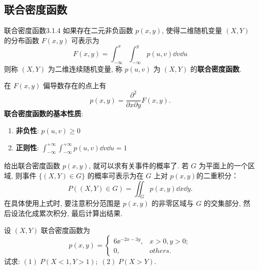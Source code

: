    \subsection{联合密度函数}\label{ssec:3.1.4}
   \begin{definition}{联合密度函数}{3.1.4}
   	如果存在二元非负函数 $p(x,y)$, 使得二维随机变量 $(X,Y)$ 的分布函数 $F(x,y)$ 可表示为
   	\begin{equation}\label{eq:3.1.3}
   	 	F(x, y)=\int_{-\infty}^{x} \int_{-\infty}^{y} p(u, v) \dd v \dd u
   	\end{equation}
   	则称 $(X,Y)$ 为二维连续随机变量, 称 $p(u,v)$ 为 $(X,Y)$ 的\textbf{联合密度函数}.
   \end{definition}
   在 $F(x,y)$ 偏导数存在的点上有
   \[
    	p(x, y)=\frac{\partial^{2}}{\partial x \partial y} F(x, y).
   \]
   \textbf{联合密度函数的基本性质}:
   \begin{enumerate}
   	\item \textbf{非负性}: $p(u,v)\geq 0$ 
   	\item \textbf{正则性}: $\int_{-\infty}^{+\infty} \int_{-\infty}^{+\infty} p(u, v) \dd v \dd u=1$
   \end{enumerate}
   给出联合密度函数 $p(x,y)$, 就可以求有关事件的概率了. 若 $G$ 为平面上的一个区域, 
   则事件 $\{(X,Y) \in G\}$ 的概率可表示为在 $G$ 上对 $p(x,y)$的二重积分：
   \begin{equation}\label{eq:3.1.4}
    	P((X, Y) \in G)=\iint_{G} p(x, y) \dd x \dd y.
   \end{equation}
   在具体使用上式时, 要注意积分范围是 $p(x,y)$ 的非零区域与 $G$ 的交集部分, 然后设法化成累次积分, 最后计算出结果.
   \begin{example}\label{exam:3.1.3}
   		设 $(X,Y)$ 联合密度函数为
   		\[
   		p(x, y)=\left\{
   		\begin{array}{cc}
   		6 \ee^{-2 x-3 y}, & x>0, y>0; \\
   		0, & others.
   		\end{array}\right.
   		\]
   		试求: $(1)\; P(X<1,Y>1); \; (2)\; P(X>Y)$.
   \end{example}
